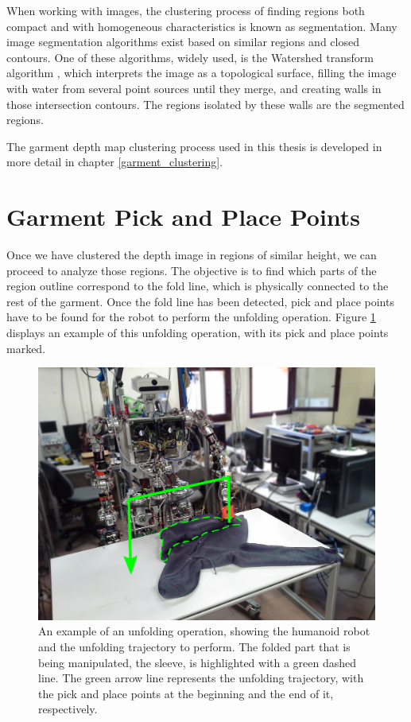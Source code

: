 When working with images, the clustering process of finding regions both compact and with homogeneous characteristics is known as segmentation. Many image segmentation algorithms exist based on similar regions and closed contours. One of these algorithms, widely used, is the Watershed transform algorithm \cite{digabel1978iterative}, which interprets the image as a topological surface, filling the image with water from several point sources until they merge, and creating walls in those intersection contours. The regions isolated by these walls are the segmented regions.

The garment depth map clustering process used in this thesis is developed in more detail in chapter \ref{garment_clustering}.

\section{Garment Pick and Place Points}
\label{garment_PnP_points}

Once we have clustered the depth image in regions of similar height, we can proceed to analyze those regions. The objective is to find which parts of the region outline correspond to the fold line, which is physically connected to the rest of the garment. Once the fold line has been detected, pick and place points have to be found for the robot to perform the unfolding operation. Figure \ref{fig:picking_points} displays an example of this unfolding operation, with its pick and place points marked.

\begin{figure}[thpb]
    \centering
    \includegraphics[width=0.8
    \textwidth]{figures/teo-pick-and-place.pdf}
    \caption{An example of an unfolding operation, showing the humanoid robot and the unfolding trajectory to perform. The folded part that is being manipulated, the sleeve, is highlighted with a green dashed line. The green arrow line represents the unfolding trajectory, with the pick and place points at the beginning and the end of it, respectively.}
    \label{fig:picking_points}
\end{figure}


